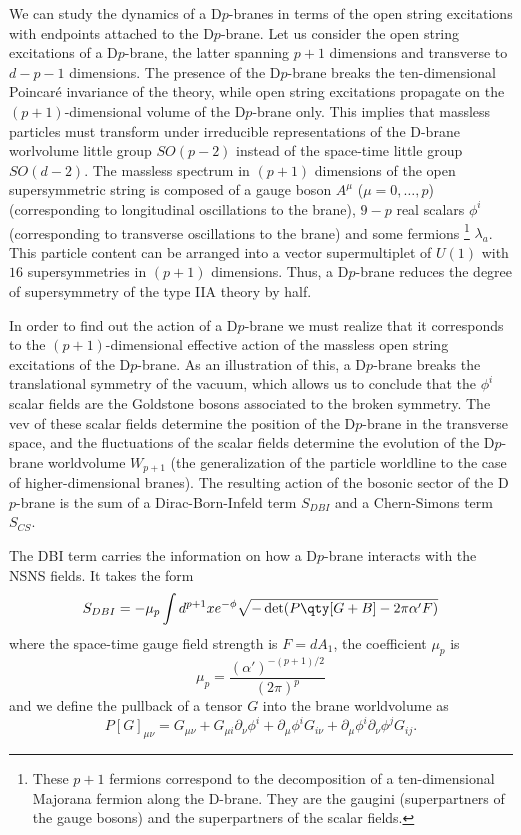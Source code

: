 We can study the dynamics of a D$p$-branes in terms of the open string excitations  with endpoints
attached to the D$p$-brane.
Let us consider the open string excitations of a D$p$-brane, the latter spanning $p+1$ dimensions and transverse to $d-p-1$ dimensions.
The presence of the D$p$-brane breaks the ten-dimensional Poincaré invariance of the theory, while
open string excitations propagate on the $(p+1)$-dimensional volume of the D$p$-brane only.
This implies that massless particles must transform under irreducible representations 
of the D-brane worlvolume little group $SO(p-2)$ instead of the space-time little group $SO(d-2)$.
The massless spectrum in $(p+1)$ dimensions of the open supersymmetric string is composed of a gauge boson $A^\mu$ ($\mu=0,\ldots,p$) (corresponding
to longitudinal oscillations to the brane),
$9-p$ real scalars $\phi^i$ (corresponding to transverse oscillations to the brane) and some fermions
\footnote{
These $p+1$ fermions correspond to the decomposition of a ten-dimensional Majorana fermion along the D-brane. They are the gaugini (superpartners of the gauge bosons) and the superpartners of the scalar fields.}
$\lambda_a$.
This particle content can be arranged into a vector supermultiplet of $U(1)$ with $16$ supersymmetries
in $(p+1)$ dimensions. 
Thus, a D$p$-brane reduces the degree of supersymmetry of the type IIA theory by half.

In order to find out the action of a D$p$-brane we must realize that it corresponds to the
$(p+1)$-dimensional effective action of the massless open string excitations of the D$p$-brane.
As an illustration of this, a D$p$-brane breaks the translational symmetry of the vacuum, which allows
us to conclude that the $\phi^i$ scalar fields are the Goldstone bosons associated to the broken symmetry. 
The vev of these scalar fields determine the position of the D$p$-brane in the transverse space, and the fluctuations of the scalar
fields determine the evolution of the D$p$-brane worldvolume $W_{p+1}$ (the generalization of the particle worldline to the case of higher-dimensional branes). 
The resulting action of the bosonic sector of the D$p$-brane is the sum of a Dirac-Born-Infeld term $S_{DBI}$ and a Chern-Simons term $S_{CS}$.

The DBI term carries the information on how a D$p$-brane interacts with the NSNS fields. 
It takes the form
\begin{equation}
  S_{DBI}= -\mu_p \int d^{p+1} x e^{-\phi} \sqrt{-\det(P\qty[G+B]-2\pi \alpha'F)}
  \label{eq:dirac}
\end{equation}
where the space-time gauge field strength is $F=dA_1$, the coefficient $\mu_p$ is
\begin{equation}
  \mu_p = \frac{(\alpha')^{-(p+1)/2}}{(2\pi)^p}
\end{equation}
and we define the pullback of a tensor $G$ into the brane worldvolume as
\begin{equation}
  P[G]_{\mu\nu}=G_{\mu\nu}+G_{\mu i}\partial_\nu \phi^i + \partial_\mu \phi^iG_{i\nu}+\partial_\mu\phi^i\partial_\nu\phi^j G_{ij}.
\end{equation}

